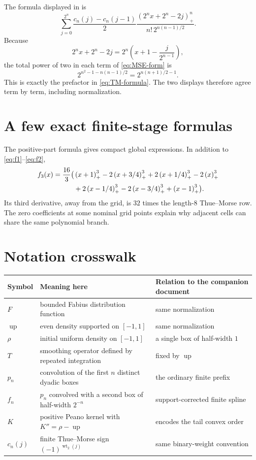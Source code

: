 \documentclass[11pt,oneside]{article}
\theoremstyle{definition}
\theoremstyle{remark}
\newcommand{\Up}{\operatorname{up}}
\newcommand{\wt}{\operatorname{wt}_2}
\newcommand{\pos}[1]{\left(#1\right)_{+}}
\begin{document}
The formula displayed in \cite{mseanswer} is
\begin{equation}
 \sum_{j=0}^{2^n}
 \frac{c_n(j)-c_n(j-1)}{2}
 \frac{\pos{2^nx+2^n-2j}^{n}}{n!\,2^{n(n-1)/2}}.           \label{eq:MSE-form}
\end{equation}
Because
\[
 2^nx+2^n-2j=2^n\left(x+1-\frac{j}{2^{n-1}}\right),
\]
the total power of two in each term of \eqref{eq:MSE-form} is
\[
 2^{n^2-1-n(n-1)/2}=2^{n(n+1)/2-1}.
\]
This is exactly the prefactor in \eqref{eq:TM-formula}.  The two displays therefore agree
term by term, including normalization.

\section{A few exact finite-stage formulas}
\label{app:first-formulas}

The positive-part formula gives compact global expressions.  In addition to
\eqref{eq:f1}--\eqref{eq:f2},
\begin{align}
 f_3(x)=\frac{16}{3}\bigl(&\pos{x+1}^{3}-2\pos{x+3/4}^{3}
 +2\pos{x+1/4}^{3}-2\pos{x}^{3}\notag\\
 &+2\pos{x-1/4}^{3}-2\pos{x-3/4}^{3}+\pos{x-1}^{3}\bigr). \label{eq:f3-global}
\end{align}
Its third derivative, away from the grid, is $32$ times the length-$8$ Thue--Morse row.
The zero coefficients at some nominal grid points explain why adjacent cells can share the
same polynomial branch.

\section{Notation crosswalk}
\label{app:notation}

\begin{center}
\begin{tabularx}{0.96\textwidth}{@{}p{}X X@{}}
\toprule
Symbol & Meaning here & Relation to the companion document\\
\midrule
$F$ & bounded Fabius distribution function & same normalization\\
$\Up$ & even density supported on $[-1,1]$ & same normalization\\
$\rho$ & initial uniform density on $[-1,1]$ & a single box of half-width $1$\\
$T$ & smoothing operator defined by repeated integration & fixed by $\Up$\\
$p_n$ & convolution of the first $n$ distinct dyadic boxes & the ordinary finite prefix\\
$f_n$ & $p_n$ convolved with a second box of half-width $2^{-n}$ & support-corrected finite spline\\
$K$ & positive Peano kernel with $K''=\rho-\Up$ & encodes the tail convex order\\
$c_n(j)$ & finite Thue--Morse sign $(-1)^{\wt(j)}$ & same binary-weight convention\\
\bottomrule
\end{tabularx}
\end{center}
\end{document}
